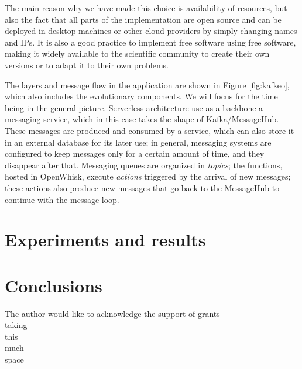 \documentclass[sigconf]{acmart}
\begin{document}
The main reason why we have made this choice is availability of
resources, but also
the fact that all parts of the implementation are open source and can
be deployed in desktop machines or other cloud providers by simply
changing names and IPs. It is also a good practice to implement free
software using free software, making it widely available to the
scientific community to create their own versions or to adapt it to
their own problems. 

The layers and message flow in the application are shown in Figure
\ref{fig:kafkeo}, which also includes the evolutionary components. We
will focus for the time being in the general picture. Serverless
architecture use as a backbone a messaging service, which in this case
takes the shape of Kafka/MessageHub. These messages are produced and
consumed by a service, which can also store it in an external database
for its later use; in general, messaging systems are configured to
keep messages only for a certain amount of time, and they disappear
after that. Messaging queues are organized in {\em topics}; the
functions, hosted in OpenWhisk, execute {\em actions} triggered by the
arrival of new messages; these actions also produce new messages that
go back to the MessageHub to continue with the message loop.



\section{Experiments and results}
\label{sec:res}

\section{Conclusions}
\label{sec:con}





\begin{acks}

  The author would like to acknowledge the support of grants\\
  taking\\
  this\\
  much\\
  space\\

\end{acks}



 
\end{document}
